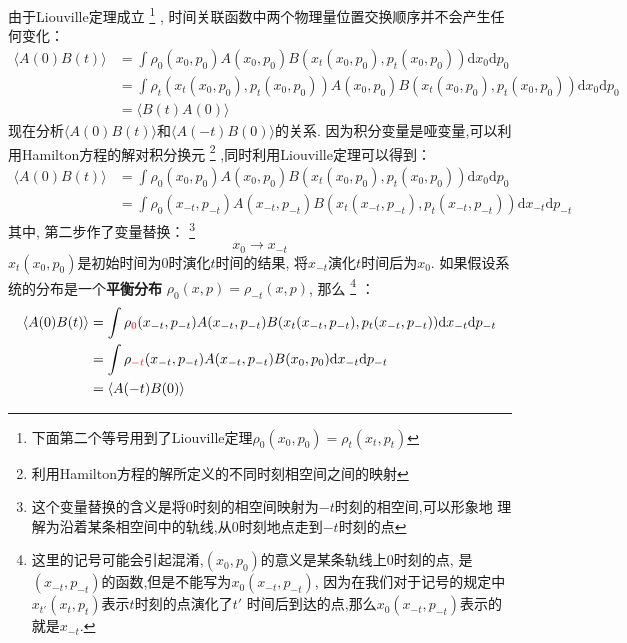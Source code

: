     由于Liouville定理成立
    \footnote{下面第二个等号用到了Liouville定理$\rho_0(x_0, p_0) = \rho_t(x_t, p_t)$}
    , 时间关联函数中两个物理量位置交换顺序并不会产生任何变化：
    \begin{equation}
        \begin{aligned}
            \langle A(0)B(t) \rangle &= \int \rho_0(x_0,p_0) A(x_0,p_0) B(x_t(x_0,p_0),p_t(x_0,p_0)) \mathrm{d}x_0 \mathrm{d}p_0\\
            &= \int \rho_t(x_t(x_0, p_0),p_t(x_0, p_0)) A(x_0,p_0) B(x_t(x_0,p_0),p_t(x_0,p_0)) \mathrm{d}x_0 \mathrm{d}p_0\\
            &= \langle B(t)A(0) \rangle
        \end{aligned}
    \end{equation}
    现在分析$\langle A(0)B(t) \rangle$和$\langle A(-t)B(0) \rangle$的关系. 
    因为积分变量是哑变量,可以利用Hamilton方程的解对积分换元
    \footnote{利用Hamilton方程的解所定义的不同时刻相空间之间的映射}
    ,同时利用Liouville定理可以得到：
    \begin{equation}
        \begin{aligned}
            \langle A(0)B(t) \rangle &= \int \rho_0(x_0,p_0) A(x_0,p_0) B(x_t(x_0,p_0),p_t(x_0,p_0)) \mathrm{d}x_0 \mathrm{d}p_0\\
            &= \int \rho_0 (x_{-t},p_{-t}) A(x_{-t},p_{-t}) B(x_t(x_{-t},p_{-t}),p_t(x_{-t},p_{-t})) \mathrm{d}x_{-t} \mathrm{d}p_{-t}
        \end{aligned}
    \end{equation}
    其中, 第二步作了变量替换：
    \footnote{这个变量替换的含义是将0时刻的相空间映射为$-t$时刻的相空间,可以形象地
    理解为沿着某条相空间中的轨线,从0时刻地点走到$-t$时刻的点}
    \begin{equation}
        x_0 \to x_{-t}
    \end{equation}
    $x_t(x_0,p_0)$是初始时间为0时演化$t$时间的结果, 
    将$x_{-t}$演化$t$时间后为$x_0$. 如果假设系统的分布是一个\textbf{平衡分布}
    $\rho_0(x,p) = \rho_{-t}(x, p)$, 那么
    \footnote{
        这里的记号可能会引起混淆,$(x_0, p_0)$的意义是某条轨线上0时刻的点,
        是$(x_{-t}, p_{-t})$的函数,但是不能写为$x_0(x_{-t}, p_{-t})$,
        因为在我们对于记号的规定中$x_{t'}(x_t, p_t)$表示$t$时刻的点演化了$t'$
        时间后到达的点,那么$x_0(x_{-t}, p_{-t})$表示的就是$x_{-t}$.
    }
    ：
    \begin{equation}
        \begin{aligned}
            \langle A(0)B(t) \rangle &= \int \rho_{\color{red}{0}}(x_{-t},p_{-t}) A(x_{-t},p_{-t}) B(x_t(x_{-t},p_{-t}),p_t(x_{-t},p_{-t})) \mathrm{d}x_{-t} \mathrm{d}p_{-t}\\
            &= \int \rho_{\color{red}{-t}}(x_{-t},p_{-t}) A(x_{-t},p_{-t}) B(x_0,p_0) \mathrm{d}x_{-t} \mathrm{d}p_{-t}\\
            &= \langle A(-t)B(0) \rangle
        \end{aligned}
    \end{equation}

